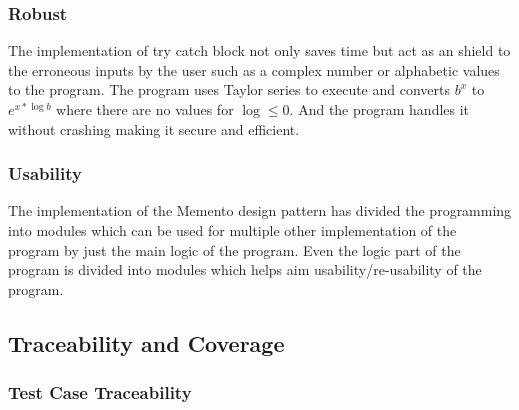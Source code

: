 \documentclass[a4paper, 11pt]{article}
\begin{document}
\subsubsection{Robust}
The implementation of try catch block not only saves time but act as an shield to the erroneous inputs by the user such as a complex number or alphabetic values to the program. The program uses Taylor series to execute and converts $b^x$ to $e^{x * \log b}$ where there are no values for $\log \leq 0$. And the program handles it without crashing making it secure and efficient.
\subsubsection{Usability}
The implementation of the Memento design pattern has divided the programming into modules which can be used for multiple other implementation of the program by just the main logic of the program. Even the logic part of the program is divided into modules which helps aim usability/re-usability of the program.

\newpage
\subsection{Traceability and Coverage}
\subsubsection{Test Case Traceability}
\end{document}
